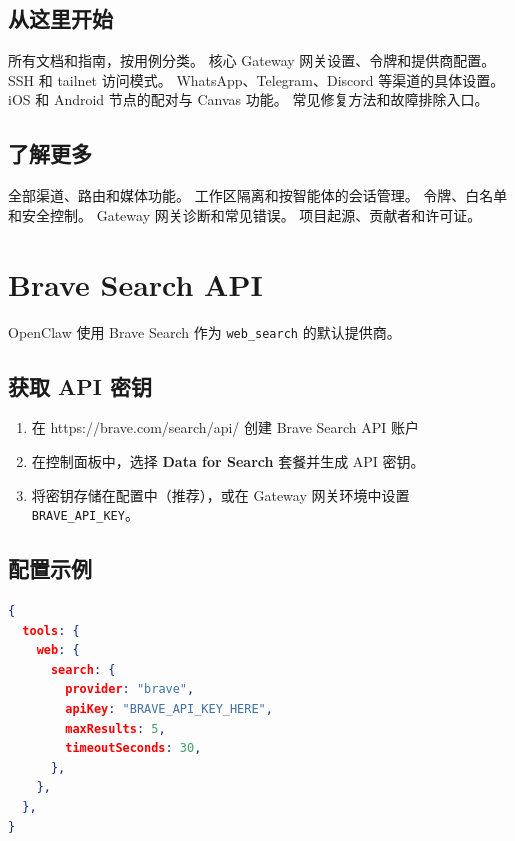 \subsection{从这里开始}


所有文档和指南，按用例分类。
核心 Gateway 网关设置、令牌和提供商配置。
SSH 和 tailnet 访问模式。
WhatsApp、Telegram、Discord 等渠道的具体设置。
iOS 和 Android 节点的配对与 Canvas 功能。
常见修复方法和故障排除入口。

\subsection{了解更多}


全部渠道、路由和媒体功能。
工作区隔离和按智能体的会话管理。
令牌、白名单和安全控制。
Gateway 网关诊断和常见错误。
项目起源、贡献者和许可证。


\clearpage

\section{Brave Search API}


OpenClaw 使用 Brave Search 作为 \texttt{web\_search} 的默认提供商。

\subsection{获取 API 密钥}


\begin{enumerate}
  \item 在 https://brave.com/search/api/ 创建 Brave Search API 账户
  \item 在控制面板中，选择 \textbf{Data for Search} 套餐并生成 API 密钥。
  \item 将密钥存储在配置中（推荐），或在 Gateway 网关环境中设置 \texttt{BRAVE\_API\_KEY}。
\end{enumerate}


\subsection{配置示例}


\begin{lstlisting}[language=json]
{
  tools: {
    web: {
      search: {
        provider: "brave",
        apiKey: "BRAVE_API_KEY_HERE",
        maxResults: 5,
        timeoutSeconds: 30,
      },
    },
  },
}
\end{lstlisting}


